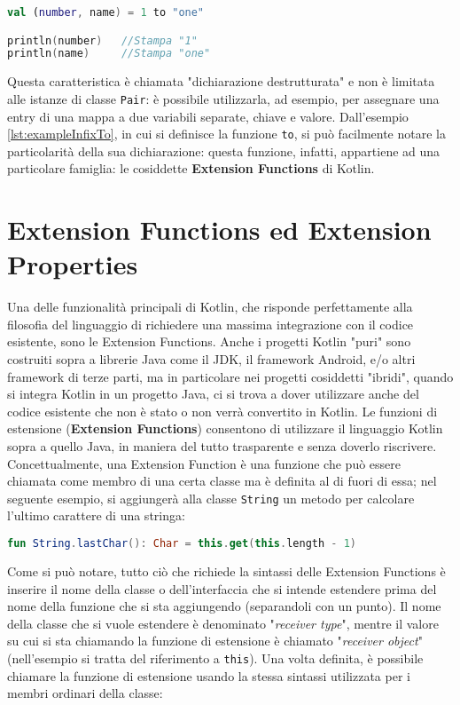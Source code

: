 \begin{lstlisting}[caption={Infix call e destructured declaration}, captionpos=b, label={lst:exampleDestructured}, language=Kotlin]
val (number, name) = 1 to "one"

println(number)   //Stampa "1"
println(name)     //Stampa "one"
\end{lstlisting}

Questa caratteristica è chiamata "dichiarazione destrutturata" e non è limitata alle istanze di classe \texttt{Pair}: è possibile utilizzarla, ad esempio, per assegnare una entry di una mappa a due variabili separate, chiave e valore. Dall'esempio \ref{lst:exampleInfixTo}, in cui si definisce la funzione \texttt{to}, si può facilmente notare la particolarità della sua dichiarazione: questa funzione, infatti, appartiene ad una particolare famiglia: le cosiddette {\bfseries Extension Functions} di Kotlin.\\

\section{Extension Functions ed Extension Properties}
Una delle funzionalità principali di Kotlin, che risponde perfettamente alla filosofia del linguaggio di richiedere una massima integrazione con il codice esistente, sono le Extension Functions. Anche i progetti Kotlin "puri" sono costruiti sopra a librerie Java come il JDK, il framework Android, e/o altri framework di terze parti, ma in particolare nei progetti cosiddetti "ibridi", quando si integra Kotlin in un progetto Java, ci si trova a dover utilizzare anche del codice esistente che non è stato o non verrà convertito in Kotlin. Le funzioni di estensione ({\bfseries Extension Functions}) consentono di utilizzare il linguaggio Kotlin sopra a quello Java, in maniera del tutto trasparente e senza doverlo riscrivere. Concettualmente, una Extension Function è una funzione che può essere chiamata come membro di una certa classe ma è definita al di fuori di essa; nel seguente esempio, si aggiungerà alla classe \texttt{String} un metodo per calcolare l’ultimo carattere di una stringa:\\
\begin{lstlisting}[caption={Definizione di una Extension Function}, captionpos=b, label={lst:exampleExtrnsionF}, language=Kotlin]
fun String.lastChar(): Char = this.get(this.length - 1)
\end{lstlisting}

Come si può notare, tutto ciò che richiede la sintassi delle Extension Functions è inserire il nome della classe o dell'interfaccia che si intende estendere prima del nome della funzione che si sta aggiungendo (separandoli con un punto). Il nome della classe che si vuole estendere è denominato "{\em receiver type}", mentre il valore su cui si sta chiamando la funzione di estensione è chiamato "{\em receiver object}" (nell’esempio si tratta del riferimento a \texttt{this}). Una volta definita, è possibile chiamare la funzione di estensione usando la stessa sintassi utilizzata per i membri ordinari della classe:\\

